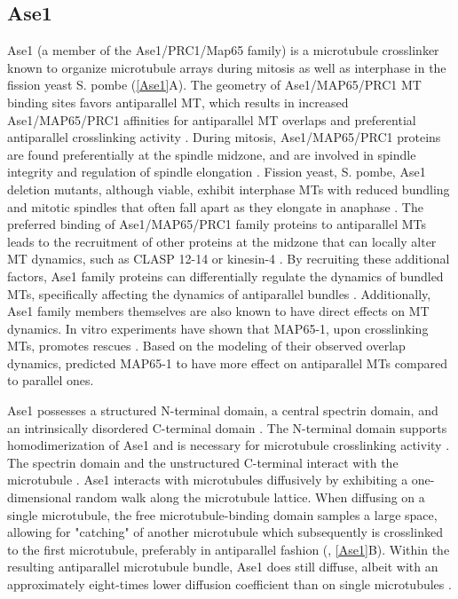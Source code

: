 \subsection{Ase1}
Ase1 (a member of the Ase1/PRC1/Map65 family) is a microtubule crosslinker known to organize microtubule arrays during mitosis as well as interphase in the fission yeast S. pombe \parencite{Loiodice2005} (\autoref{Ase1}A). The geometry of Ase1/MAP65/PRC1 MT binding sites favors antiparallel MT, which results in increased Ase1/MAP65/PRC1 affinities for antiparallel MT overlaps and preferential antiparallel crosslinking activity \parencite{She2019,Bieling2010,Janson2007,Subramanian2010,Kellogg2016,Gaillard2008}. During mitosis, Ase1/MAP65/PRC1 proteins are found preferentially at the spindle midzone, and are involved in spindle integrity and regulation of spindle elongation \parencite{Loiodice2005,Yamashita2005,She2019}. Fission yeast, S. pombe, Ase1 deletion mutants, although viable, exhibit interphase MTs with reduced bundling and mitotic spindles that often fall apart as they elongate in anaphase \parencite{Loiodice2005,Yamashita2005}. The preferred binding of Ase1/MAP65/PRC1 family proteins to antiparallel MTs leads to the recruitment of other proteins at the midzone that can locally alter MT dynamics, such as CLASP 12-14 or kinesin-4 \parencite{Bieling2010, Mani2021}. By recruiting these additional factors, Ase1 family proteins can differentially regulate the dynamics of bundled MTs, specifically affecting the dynamics of antiparallel bundles \parencite{Bieling2010, Mani2021}. Additionally, Ase1 family members themselves are also known to have direct effects on MT dynamics. In vitro experiments have shown that MAP65-1, upon crosslinking MTs, promotes rescues \parencite{Stoppin-Mellet2013}. Based on the modeling of their observed overlap dynamics, \cite{Stoppin-Mellet2013} predicted MAP65-1 to have more effect on antiparallel MTs compared to parallel ones. \par
Ase1 possesses a structured N-terminal domain, a central spectrin domain, and an intrinsically disordered C-terminal domain \parencite{Kapitein2008,Kellogg2018}. The N-terminal domain supports homodimerization of Ase1 and is necessary for microtubule crosslinking activity \parencite{Janson2007}. The spectrin domain and the unstructured C-terminal interact with the microtubule \parencite{Kellogg2018}. Ase1 interacts with microtubules diffusively by exhibiting a one-dimensional random walk along the microtubule lattice. When diffusing on a single microtubule, the free microtubule-binding domain samples a large space, allowing for "catching" of another microtubule which subsequently is crosslinked to the first microtubule, preferably in antiparallel fashion (\cite{Janson2007}, \autoref{Ase1}B). Within the resulting antiparallel microtubule bundle, Ase1 does still diffuse, albeit with an approximately eight-times lower diffusion coefficient than on single microtubules \parencite{lanskydiffusible2015}.

